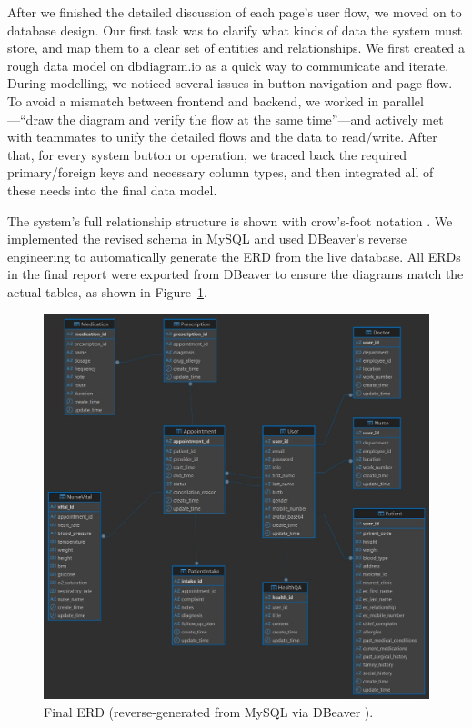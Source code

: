 %
%

After we finished the detailed discussion of each page’s user flow, we moved on to database design. Our first task was to clarify what kinds of data the system must store, and map them to a clear set of entities and relationships. We first created a rough data model on dbdiagram.io \citep{dbmldocs} as a quick way to communicate and iterate. During modelling, we noticed several issues in button navigation and page flow. To avoid a mismatch between frontend and backend, we worked in parallel—“draw the diagram and verify the flow at the same time”—and actively met with teammates to unify the detailed flows and the data to read/write. After that, for every system button or operation, we traced back the required primary/foreign keys and necessary column types, and then integrated all of these needs into the final data model.




The system’s full relationship structure is shown with crow’s-foot notation \citep{crowsfoot}. We implemented the revised schema in MySQL and used DBeaver’s reverse engineering \citep{dbeaverERD} to automatically generate the ERD from the live database. All ERDs in the final report were exported from DBeaver to ensure the diagrams match the actual tables, as shown in Figure~\ref{fig:final_erd}.

\begin{figure}[!htbp]
  \centering
  \includegraphics[width=\linewidth]{../../images/ERD.jpeg}
  \caption{Final ERD (reverse-generated from MySQL via DBeaver \protect\citep{dbeaverERD}).}
  \label{fig:final_erd}
\end{figure}
\FloatBarrier

